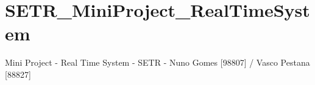 \chapter{SETR\+\_\+\+Mini\+Project\+\_\+\+Real\+Time\+System}
\hypertarget{md_README}{}\label{md_README}
\label{md_README_autotoc_md0}%
%
Mini Project -\/ Real Time System -\/ SETR -\/ Nuno Gomes \mbox{[}98807\mbox{]} / Vasco Pestana \mbox{[}88827\mbox{]} 